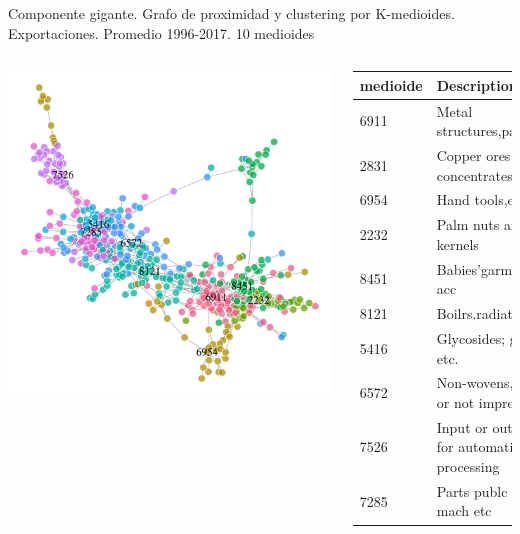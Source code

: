 \documentclass[compress]{beamer}
\begin{document}
\begin{frame}
	\small{Componente gigante. Grafo de proximidad y clustering por K-medioides. Exportaciones. Promedio 1996-2017. 10 medioides}
\begin{columns}[c] 

	
		\includegraphics[width=\linewidth]{pam10_gigant}


	\tiny
\begin{table}
	\centering
	\begin{tabular}{ll}
		\hline
		medioide & Description \\ 
		\hline
		6911 & Metal structures,parts \\ 
		2831 & Copper ores and concentrates \\ 
		6954 & Hand tools,etc. nes \\ 
		2232 & Palm nuts and kernels \\ 
		8451 & Babies'garmnts,clths acc \\ 
		8121 & Boilrs.radiatrs,etc.n.el \\ 
		5416 & Glycosides; glands etc. \\ 
		6572 & Non-wovens, whether or not impregnated \\ 
		7526 & Input or output units for automatic data processing \\ 
		7285 & Parts publc wrk mach etc \\ 
		\hline
	\end{tabular}
\end{table}
	
\end{columns}

\end{frame}
\end{document}
